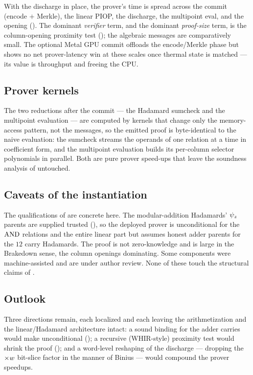 \begin{remark}
\label{rem:cost-structure}
With the discharge in place, the prover's time is spread across the commit
(encode $+$ Merkle), the linear PIOP, the discharge, the multipoint eval, and the
opening (). The dominant \emph{verifier} term, and the
dominant \emph{proof-size} term, is the column-opening proximity test
(); the algebraic messages are comparatively small. The
optional Metal GPU commit offloads the encode/Merkle phase but shows no net
prover-latency win at these scales once thermal state is matched --- its value is
throughput and freeing the CPU.
\end{remark}

\subsection{Prover kernels}
\label{sec:impl-kernels}

The two reductions after the commit --- the Hadamard sumcheck and the multipoint
evaluation --- are computed by kernels that change only the memory-access
pattern, not the messages, so the emitted proof is byte-identical to the naive
evaluation: the sumcheck streams the operands of one relation at a time in
coefficient form, and the multipoint evaluation builds its per-column selector
polynomials in parallel. Both are pure prover speed-ups that leave the soundness
analysis of  untouched.

\subsection{Caveats of the instantiation}
\label{sec:impl-caveats}

The qualifications of  are concrete here. The modular-addition
Hadamards' $\psi_{z}$ parents are supplied trusted (), so the
deployed prover is unconditional for the $\operatorname{AND}$ relations and the entire linear
part but assumes honest adder parents for the $12$ carry Hadamards. The proof is
not zero-knowledge and is large in the Brakedown sense, the column openings
dominating. Some components were machine-assisted and are under author review.
None of these touch the structural claims of
.

\subsection{Outlook}
\label{sec:outlook}

Three directions remain, each localized and each leaving the arithmetization and
the linear/Hadamard architecture intact: a sound binding for the adder carries
would make  unconditional (); a recursive
(WHIR-style) proximity test would shrink the proof (); and a
word-level reshaping of the discharge --- dropping the $\times w$ bit-slice
factor in the manner of Binius --- would compound the prover speedups.
